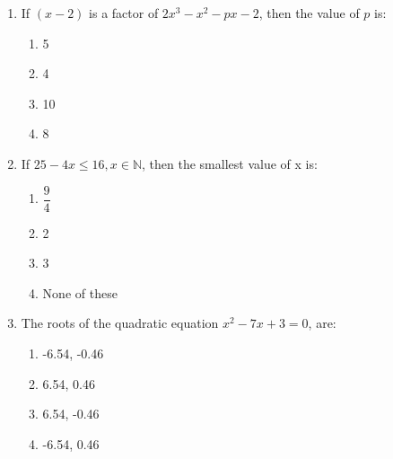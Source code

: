 \begin{enumerate}[label=(\roman*)]
    \item If $(x-2)$ is a factor of $2x^3 - x^2 - px - 2$, then the value of 
        $p$ is:

        \begin{multicols}{2}
        \begin{enumerate}[label=(\alph*)]
            \item 5
            \item 4
            \item 10
            \item 8
        \end{enumerate}
        \end{multicols}

    \item If $25 - 4x \leq 16, x \in \mathbb{N}$, then the smallest value of 
        x is:

        \begin{multicols}{2}
        \begin{enumerate}[label=(\alph*)]
            \item $\dfrac94$
            \item 2
            \item 3
            \item None of these
        \end{enumerate}
        \end{multicols}

    \item The roots of the quadratic equation $x^2 - 7x + 3 = 0$, are: 

        \begin{multicols}{2}
        \begin{enumerate}[label=(\alph*)]
            \item -6.54, -0.46 
            \item 6.54, 0.46 
            \item 6.54, -0.46 
            \item -6.54, 0.46 
        \end{enumerate}
        \end{multicols}


\end{enumerate}
